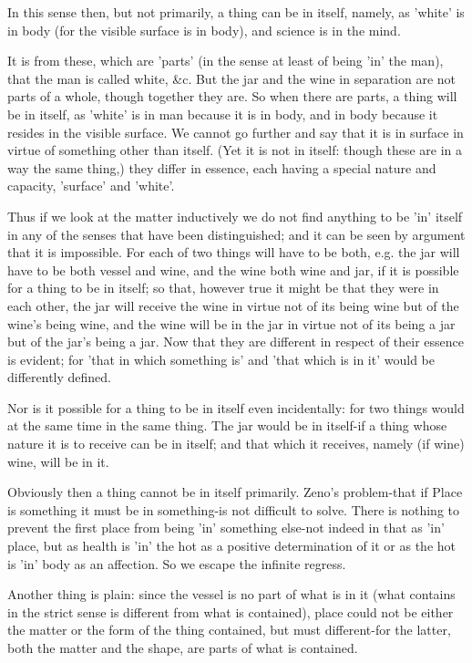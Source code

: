 In this sense then, but not primarily, a thing can be in itself, namely,
as 'white' is in body (for the visible surface is in body), and science
is in the mind. 

It is from these, which are 'parts' (in the sense at least of being
'in' the man), that the man is called white, &c. But the jar and the
wine in separation are not parts of a whole, though together they
are. So when there are parts, a thing will be in itself, as 'white'
is in man because it is in body, and in body because it resides in
the visible surface. We cannot go further and say that it is in surface
in virtue of something other than itself. (Yet it is not in itself:
though these are in a way the same thing,) they differ in essence,
each having a special nature and capacity, 'surface' and 'white'.

Thus if we look at the matter inductively we do not find anything
to be 'in' itself in any of the senses that have been distinguished;
and it can be seen by argument that it is impossible. For each of
two things will have to be both, e.g. the jar will have to be both
vessel and wine, and the wine both wine and jar, if it is possible
for a thing to be in itself; so that, however true it might be that
they were in each other, the jar will receive the wine in virtue not
of its being wine but of the wine's being wine, and the wine will
be in the jar in virtue not of its being a jar but of the jar's being
a jar. Now that they are different in respect of their essence is
evident; for 'that in which something is' and 'that which is in it'
would be differently defined. 

Nor is it possible for a thing to be in itself even incidentally:
for two things would at the same time in the same thing. The jar would
be in itself-if a thing whose nature it is to receive can be in itself;
and that which it receives, namely (if wine) wine, will be in it.

Obviously then a thing cannot be in itself primarily. 
Zeno's problem-that if Place is something it must be in something-is
not difficult to solve. There is nothing to prevent the first place
from being 'in' something else-not indeed in that as 'in' place, but
as health is 'in' the hot as a positive determination of it or as
the hot is 'in' body as an affection. So we escape the infinite regress.

Another thing is plain: since the vessel is no part of what is in
it (what contains in the strict sense is different from what is contained),
place could not be either the matter or the form of the thing contained,
but must different-for the latter, both the matter and the shape,
are parts of what is contained. 

